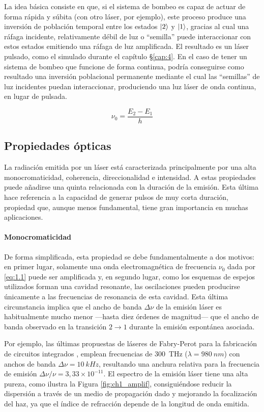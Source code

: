 La idea básica consiste en que, si el sistema de bombeo es capaz de actuar de forma rápida y súbita (con otro láser, por ejemplo), este proceso produce una inversión de población temporal entre los estados $\left|2\right\rangle$ y $\left|1\right\rangle$, gracias al cual una ráfaga incidente, relativamente débil de luz o \enquote{semilla} puede interaccionar con estos estados emitiendo una ráfaga de luz amplificada. El resultado es un láser pulsado, como el simulado durante el capítulo \S\ref{cap:4}. En el caso de tener un sistema de bombeo que funcione de forma continua, podría conseguirse como resultado una inversión poblacional permanente mediante el cual las \enquote{semillas} de luz incidentes puedan interaccionar, produciendo una luz láser de onda continua, en lugar de pulsada.

\begin{equation}\label{eq:1.1}
  \nu_{0} = \frac{E_{2}-E_{1}}{h}
\end{equation}

\subsection{Propiedades ópticas}\label{sec:1.1.2}
La radiación emitida por un láser está caracterizada principalmente por una alta monocromaticidad, coherencia, direccionalidad e intensidad. A estas propiedades puede añadirse una quinta relacionada con la duración de la emisión\autocite{Svelto2010}. Esta última hace referencia a la capacidad de generar pulsos de muy corta duración, propiedad que, aunque menos fundamental, tiene gran importancia en muchas aplicaciones. 

\paragraph{Monocromaticidad}\label{par:1.1.2.1}
De forma simplificada, esta propiedad se debe fundamentalmente a dos motivos: en primer lugar, solamente una onda electromagnética de frecuencia $\nu_0$ dada por \eqref{eq:1.1} puede ser amplificada y, en segundo lugar, como los esquemas de espejos utilizados forman una cavidad resonante, las oscilaciones pueden producirse únicamente a las frecuencias de resonancia de esta cavidad. Esta última circunstancia implica que el ancho de banda $\Delta\nu$ de la emisión láser es habitualmente mucho menor ---hasta diez órdenes de magnitud--- que el ancho de banda observado en la transición $2\rightarrow 1$ durante la emisión espontánea asociada.

Por ejemplo, las últimas propuestas de láseres de Fabry-Perot para la fabricación de circuitos integrados \autocite{Tran2022}, emplean frecuencias de \qty{300}{THz} ($\lambda = \qty{980}{nm}$) con anchos de banda $\Delta\nu = \qty{10}{kHz}$, resultando una anchura relativa para la frecuencia de emisión $\Delta\nu/\nu = 3,33\times 10^{-11}$. El espectro de la emisión láser tiene una alta pureza, como ilustra la Figura \ref{fig:ch1_amplif}, consiguiéndose reducir la dispersión a través de un medio de propagación dado y mejorando la focalización del haz, ya que el índice de refracción depende de la longitud de onda emitida.

